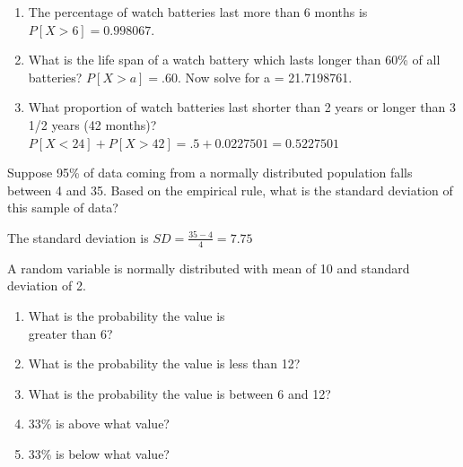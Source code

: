 \documentclass[11pt, chapterprefix=true]{scrbook}\usepackage[]{graphicx}\usepackage[]{color}
\begin{document}
\begin{exercises}
\begin{exercise}
	\end{exercise}
	\begin{solution}  %



\begin{enumerate}
	\item The percentage of watch batteries last more than 6 months is $P[ X > 6] = 0.998067$.
	\item What is the life span of a watch battery which lasts longer than 60\% of all batteries?  $P[X > a] = .60$. Now solve for a = 21.7198761.
	\item What proportion of watch batteries last shorter than 2 years or longer
than 3 1/2 years (42 months)?
$P[X < 24] + P[X > 42] = .5 + 0.0227501 = 0.5227501$
 \end{enumerate}

	\end{solution}

  \begin{exercise} %

Suppose 95\% of data coming from a normally distributed population falls between 4 and 35.  Based on the empirical rule, what is the standard deviation of this sample of data?

  \end{exercise}
  \begin{solution}   %



    The standard deviation is $SD = \frac{35 - 4}{4} = 7.75$
  \end{solution}

	\begin{exercise}  %

A random variable is normally distributed with mean of 10 and standard deviation of 2.

\begin{enumerate}
\item What is the probability the value is \\ greater than 6?
\item What is the probability the value is less than 12?
\item What is the probability the value is between 6 and 12?
\item 33\% is above what value?
\item 33\% is below what value?
\end{enumerate}

	\end{exercise}
	\begin{solution}  %



\end{solution}
\end{exercises}
\end{document}
